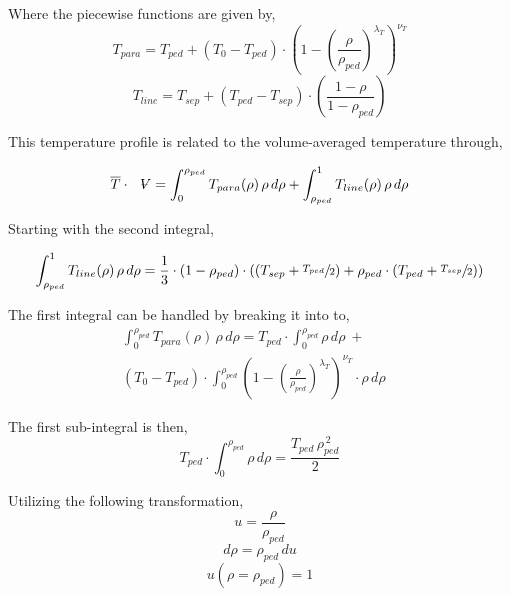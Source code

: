 Where the piecewise functions are given by,
\begin{equation}
	T_{para} = T_{ped} + ( T_{0} - T_{ped} ) \cdot \left( 1 - \left( \frac{\rho}{\rho_{ped}} \right)^{\lambda_T} \right)^{\nu_T}
\end{equation}
\begin{equation}
	T_{line} = T_{sep} + ( T_{ped} - T_{sep} ) \cdot \left( \frac{ 1 - \rho }{ 1 - \rho_{ped} } \right)
\end{equation}

This temperature profile is related to the volume-averaged temperature through,

\begin{equation}
	\overline{T} \cdot \volume = \int_0^{\rho_{ped}} T_{para}(\rho) \, \rho \, d\rho + \int_{\rho_{ped}}^1 T_{line}(\rho) \, \rho \, d\rho
\end{equation}

Starting with the second integral,

\begin{equation}
	\int_{\rho_{ped}}^1 T_{line}(\rho) \, \rho \, d\rho = \frac{1}{3} \cdot ( 1 - \rho_{ped} ) \cdot \left( \left( T_{sep} + \sfrac{ T_{ped} }{2} \right) + \rho_{ped} \cdot \left( T_{ped} + \sfrac{ T_{sep} }{2}  \right)  \right)
\end{equation}

The first integral can be handled by breaking it into to,
\begin{multline}
	\int_0^{\rho_{ped}} T_{para}(\rho) \, \rho \, d\rho = T_{ped} \cdot \int_0^{\rho_{ped}} \rho \, d\rho \ + \\ ( T_{0} - T_{ped} ) \cdot \int_0^{\rho_{ped}} \left( 1 - \left( \frac{\rho}{\rho_{ped}} \right)^{\lambda_T} \right)^{\nu_T}  \cdot \rho \, d\rho \ \ \  \
\end{multline}

The first sub-integral is then,
\begin{equation}
	T_{ped} \cdot \int_0^{\rho_{ped}} \rho \, d\rho = \frac{ T_{ped} \, \rho_{ped}^{\,2} }{2}
\end{equation}

Utilizing the following transformation,
\begin{equation}
	u = \frac{\rho}{\rho_{ped}}
\end{equation}
\begin{equation}
	d\rho = \rho_{ped} \, du
\end{equation}
\begin{equation}
	u( \rho=\rho_{ped} ) = 1
\end{equation}

